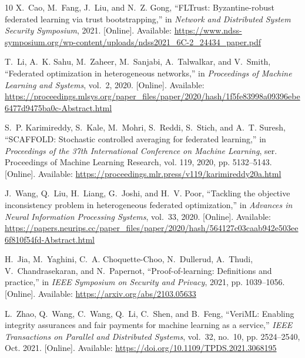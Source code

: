 \documentclass[journal]{IEEEtran}
\begin{document}
\begin{thebibliography}{10}
\BIBentryALTinterwordspacing
X.~Cao, M.~Fang, J.~Liu, and N.~Z. Gong, ``{FLTrust}: Byzantine-robust
  federated learning via trust bootstrapping,'' in \emph{Network and
  Distributed System Security Symposium}, 2021. [Online]. Available:
  \url{https://www.ndss-symposium.org/wp-content/uploads/ndss2021_6C-2_24434_paper.pdf}
\BIBentrySTDinterwordspacing

\BIBentryALTinterwordspacing
T.~Li, A.~K. Sahu, M.~Zaheer, M.~Sanjabi, A.~Talwalkar, and V.~Smith,
  ``Federated optimization in heterogeneous networks,'' in \emph{Proceedings of
  Machine Learning and Systems}, vol.~2, 2020. [Online]. Available:
  \url{https://proceedings.mlsys.org/paper_files/paper/2020/hash/1f5fe83998a09396ebe6477d9475ba0c-Abstract.html}
\BIBentrySTDinterwordspacing

\BIBentryALTinterwordspacing
S.~P. Karimireddy, S.~Kale, M.~Mohri, S.~Reddi, S.~Stich, and A.~T. Suresh,
  ``{SCAFFOLD}: Stochastic controlled averaging for federated learning,'' in
  \emph{Proceedings of the 37th International Conference on Machine Learning},
  ser. Proceedings of Machine Learning Research, vol. 119, 2020, pp.
  5132--5143. [Online]. Available:
  \url{https://proceedings.mlr.press/v119/karimireddy20a.html}
\BIBentrySTDinterwordspacing

\BIBentryALTinterwordspacing
J.~Wang, Q.~Liu, H.~Liang, G.~Joshi, and H.~V. Poor, ``Tackling the objective
  inconsistency problem in heterogeneous federated optimization,'' in
  \emph{Advances in Neural Information Processing Systems}, vol.~33, 2020.
  [Online]. Available:
  \url{https://papers.neurips.cc/paper_files/paper/2020/hash/564127c03caab942e503ee6f810f54fd-Abstract.html}
\BIBentrySTDinterwordspacing

\BIBentryALTinterwordspacing
H.~Jia, M.~Yaghini, C.~A. Choquette-Choo, N.~Dullerud, A.~Thudi,
  V.~Chandrasekaran, and N.~Papernot, ``Proof-of-learning: Definitions and
  practice,'' in \emph{IEEE Symposium on Security and Privacy}, 2021, pp.
  1039--1056. [Online]. Available: \url{https://arxiv.org/abs/2103.05633}
\BIBentrySTDinterwordspacing

\BIBentryALTinterwordspacing
L.~Zhao, Q.~Wang, C.~Wang, Q.~Li, C.~Shen, and B.~Feng, ``{VeriML}: Enabling
  integrity assurances and fair payments for machine learning as a service,''
  \emph{IEEE Transactions on Parallel and Distributed Systems}, vol.~32,
  no.~10, pp. 2524--2540, Oct. 2021. [Online]. Available:
  \url{https://doi.org/10.1109/TPDS.2021.3068195}
\BIBentrySTDinterwordspacing


\end{thebibliography}
\end{document}
